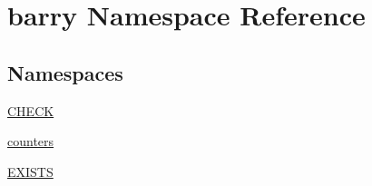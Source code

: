 \hypertarget{namespacebarry}{}\section{barry Namespace Reference}
\label{namespacebarry}
\subsection*{Namespaces}
\begin{DoxyCompactItemize}
\item 
 \hyperlink{namespacebarry_1_1_c_h_e_c_k}{C\+H\+E\+CK}
\item 
 \hyperlink{namespacebarry_1_1counters}{counters}
\item 
 \hyperlink{namespacebarry_1_1_e_x_i_s_t_s}{E\+X\+I\+S\+TS}
\end{DoxyCompactItemize}
